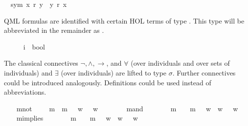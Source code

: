 \begin{isabellebody}
\ \ sym{\isacharcolon}\ {\isachardoublequoteopen}x\ r\ y\ {\isasymlongrightarrow}\ y\ r\ x{\isachardoublequoteclose}%
\begin{isamarkuptext}%
QML formulas are identified with certain HOL terms of type . 
This type will be abbreviated in the remainder as \isa{{\isasymsigma}}.%
\end{isamarkuptext}%
\isamarkuptrue%
\ \ \isamarkupfalse%
\ {\isasymsigma}\ {\isacharequal}\ {\isachardoublequoteopen}{\isacharparenleft}i\ {\isasymRightarrow}\ bool{\isacharparenright}{\isachardoublequoteclose}%
\begin{isamarkuptext}%
The classical connectives $\neg, \wedge, \rightarrow$, and $\forall$
(over individuals and over sets of individuals) and $\exists$ (over individuals) are
lifted to type $\sigma$. Further connectives could be introduced analogously. Definitions 
could be used instead of abbreviations.%
\end{isamarkuptext}%
\isamarkuptrue%
\ \ \isamarkupfalse%
\ mnot\ {\isacharcolon}{\isacharcolon}\ {\isachardoublequoteopen}{\isasymsigma}\ {\isasymRightarrow}\ {\isasymsigma}{\isachardoublequoteclose}\ {\isacharparenleft}{\isachardoublequoteopen}m{\isasymnot}{\isachardoublequoteclose}{\isacharparenright}\ \ {\isachardoublequoteopen}m{\isasymnot}\ {\isasymphi}\ {\isasymequiv}\ {\isacharparenleft}{\isasymlambda}w{\isachardot}\ {\isasymnot}\ {\isasymphi}\ w{\isacharparenright}{\isachardoublequoteclose}\ \ \ \ \isanewline
\ \ \isamarkupfalse%
\ mand\ {\isacharcolon}{\isacharcolon}\ {\isachardoublequoteopen}{\isasymsigma}\ {\isasymRightarrow}\ {\isasymsigma}\ {\isasymRightarrow}\ {\isasymsigma}{\isachardoublequoteclose}\ {\isacharparenleft}\ {\isachardoublequoteopen}m{\isasymand}{\isachardoublequoteclose}\ {}{}{\isacharparenright}\ \ {\isachardoublequoteopen}{\isasymphi}\ m{\isasymand}\ {\isasympsi}\ {\isasymequiv}\ {\isacharparenleft}{\isasymlambda}w{\isachardot}\ {\isasymphi}\ w\ {\isasymand}\ {\isasympsi}\ w{\isacharparenright}{\isachardoublequoteclose}\ \ \ \isanewline
\ \ \isamarkupfalse%
\ mimplies\ {\isacharcolon}{\isacharcolon}\ {\isachardoublequoteopen}{\isasymsigma}\ {\isasymRightarrow}\ {\isasymsigma}\ {\isasymRightarrow}\ {\isasymsigma}{\isachardoublequoteclose}\ {\isacharparenleft}\ {\isachardoublequoteopen}m{\isasymRightarrow}{\isachardoublequoteclose}\ {}{}{\isacharparenright}\ \ {\isachardoublequoteopen}{\isasymphi}\ m{\isasymRightarrow}\ {\isasympsi}\ {\isasymequiv}\ {\isacharparenleft}{\isasymlambda}w{\isachardot}\ {\isasymphi}\ w\ {\isasymlongrightarrow}\ {\isasympsi}\ w{\isacharparenright}{\isachardoublequoteclose}\ \ \isanewline

\end{isabellebody}
